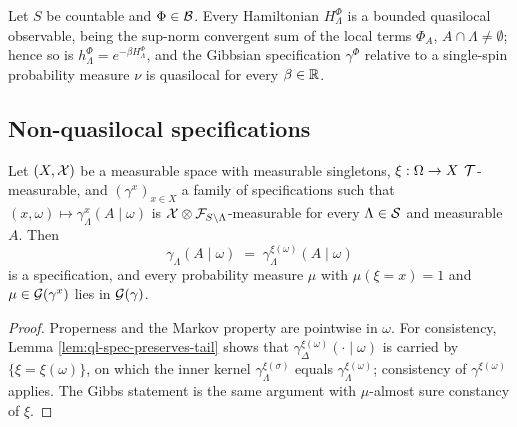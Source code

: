 \begin{example}
    \label{ex:ql-2-25}
    \leanok

    Let $S$ be countable and $\Phi \in \mathcal{B}$. Every Hamiltonian $H_\Lambda^\Phi$ is a bounded
    quasilocal observable, being the sup-norm convergent sum of the local terms $\Phi_A$,
    $A \cap \Lambda \ne \emptyset$; hence so is $h_\Lambda^\Phi = e^{-\beta H_\Lambda^\Phi}$, and
    the Gibbsian specification $\gamma^\Phi$ relative to a single-spin probability measure $\nu$ is
    quasilocal for every $\beta \in \mathbb{R}$.
\end{example}


\subsection*{Non-quasilocal specifications}

\begin{proposition}
    \label{prop:ql-glued}
    \leanok

    Let $(X, \mathcal{X})$ be a measurable space with measurable singletons, $\xi : \Omega \to X$
    $\mathcal{T}$-measurable, and $(\gamma^x)_{x \in X}$ a family of specifications such that
    $(x, \omega) \mapsto \gamma^x_\Lambda(A \mid \omega)$ is
    $\mathcal{X} \otimes \mathcal{F}_{S \setminus \Lambda}$-measurable for every $\Lambda \in \mathcal{S}$ and
    measurable $A$. Then
    \[\gamma_\Lambda(A \mid \omega) \;=\; \gamma^{\xi(\omega)}_\Lambda(A \mid \omega)\]
    is a specification, and every probability measure $\mu$ with $\mu(\xi = x) = 1$ and
    $\mu \in \mathcal{G}(\gamma^x)$ lies in $\mathcal{G}(\gamma)$.
\end{proposition}
\begin{proof}
    \leanok

    Properness and the Markov property are pointwise in $\omega$. For consistency,
    Lemma \ref{lem:ql-spec-preserves-tail} shows that $\gamma^{\xi(\omega)}_\Delta(\cdot \mid \omega)$
    is carried by $\{\xi = \xi(\omega)\}$, on which the inner kernel $\gamma^{\xi(\sigma)}_\Lambda$
    equals $\gamma^{\xi(\omega)}_\Lambda$; consistency of $\gamma^{\xi(\omega)}$ applies. The
    Gibbs statement is the same argument with $\mu$-almost sure constancy of $\xi$.
\end{proof}

